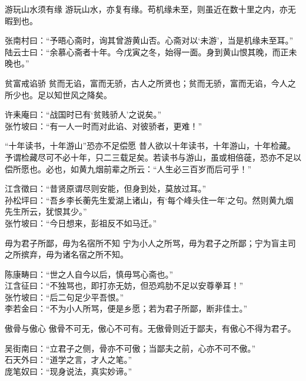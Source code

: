 \begin{yulu}{游玩山水须有缘}
游玩山水，亦复有缘。苟机缘未至，则虽近在数十里之内，亦无暇到也。
\begin{comments}
张南村曰：“予晤心斋时，询其曾游黄山否。心斋对以‘未游’，当是机缘未至耳。” \\
陆云士曰：“余慕心斋者十年。今戊寅之冬，始得一面。身到黄山恨其晚，而正未晚也。”
\end{comments}
\end{yulu}

\begin{yulu}{贫富戒谄骄}
贫而无谄，富而无骄，古人之所贤也；贫而无骄，富而无谄，今人之所少也。足以知世风之降矣。
\begin{comments}
许耒庵曰：“战国时已有‘贫贱骄人’之说矣。” \\
张竹坡曰：“有一人一时而对此谄、对彼骄者，更难！”
\end{comments}
\end{yulu}

\begin{yulu}{“十年读书，十年游山”恐亦不足偿愿}
昔人欲以十年读书，十年游山，十年检藏。予谓检藏尽可不必十年，只二三载足矣。若读书与游山，虽或相倍蓰，恐亦不足以偿所愿也。必也，如黄九烟前辈之所云：“人生必三百岁而后可乎！”
\begin{comments}
江含徵曰：“昔贤原谓尽则安能，但身到处，莫放过耳。” \\
孙松坪曰：“吾乡李长蘅先生爱湖上诸山，有‘每个峰头住一年’之句。然则黄九烟先生所云，犹恨其少。” \\
张竹坡曰：“今日想来，彭祖反不如马迁。”
\end{comments}
\end{yulu}

\begin{yulu}{毋为君子所鄙，毋为名宿所不知}
宁为小人之所骂，毋为君子之所鄙；宁为盲主司之所摈弃，毋为诸名宿之所不知。
\begin{comments}
陈康畴曰：“世之人自今以后，慎毋骂心斋也。” \\
江含征曰：“不独骂也，即打亦无妨，但恐鸡肋不足以安尊拳耳！” \\
张竹坡曰：“后二句足少平吾恨。” \\
李若金曰：“不为小人所骂，便是乡愿；若为君子所鄙，断非佳士。”
\end{comments}
\end{yulu}

\begin{yulu}{傲骨与傲心}
傲骨不可无，傲心不可有。无傲骨则近于鄙夫，有傲心不得为君子。
\begin{comments}
吴街南曰：“立君子之侧，骨亦不可傲；当鄙夫之前，心亦不可不傲。” \\
石天外曰：“道学之言，才人之笔。” \\
庞笔奴曰：“现身说法，真实妙谛。”
\end{comments}
\end{yulu}

